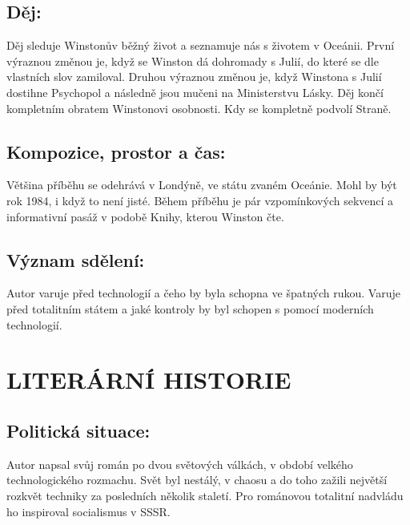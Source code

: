 \documentclass[A4paper]{extarticle} %
\begin{document}
\subsection*{Děj:}
{\setlength{\parindent}{5pt}
Děj sleduje Winstonův běžný život a seznamuje nás s životem v Oceánii. První výraznou změnou je, když se Winston dá dohromady s Julií, do které se dle vlastních slov zamiloval. Druhou výraznou změnou je, když Winstona s Julií dostihne Psychopol a následně jsou mučeni na Ministerstvu Lásky. Děj končí kompletním obratem Winstonovi osobnosti. Kdy se kompletně podvolí Straně.
}
\subsection*{Kompozice, prostor a čas:}
\noindent 
Většina příběhu se odehrává v Londýně, ve státu zvaném Oceánie. Mohl by být rok 1984, i když to není jisté. Během příběhu je pár vzpomínkových sekvencí a informativní pasáž v podobě Knihy, kterou Winston čte.

\subsection*{Význam sdělení:}
\noindent
Autor varuje před technologií a čeho by byla schopna ve špatných rukou. Varuje před totalitním státem a jaké kontroly by byl schopen s pomocí moderních technologií. 

\section*{LITERÁRNÍ HISTORIE}

\subsection*{Politická situace:}
Autor napsal svůj román po dvou světových válkách, v období velkého technologického rozmachu. Svět byl nestálý, v chaosu a do toho zažili největší rozkvět techniky za posledních několik staletí. Pro románovou totalitní nadvládu ho inspiroval socialismus v SSSR.


\end{document}
